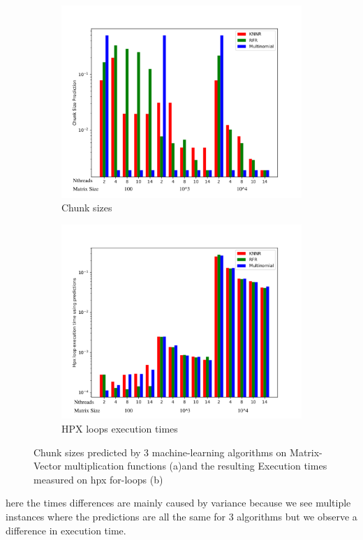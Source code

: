 \begin{figure}[h]
	\centering
	\begin{subfigure}[b]{0.5\textwidth}
		\centering
		\includegraphics[width=\textwidth]{images/bars_Vector_cs.pdf}
		\caption[Network2]%
		{{Chunk sizes}}    
	\end{subfigure}
	\hfill
	\begin{subfigure}[b]{0.49\textwidth}  
		\centering 
		\includegraphics[width=\textwidth]{images/bars_vector_times.pdf}
		\caption[]%
		{{HPX loops execution times}}    
	\end{subfigure}
	\caption{Chunk sizes predicted by 3 machine-learning algorithms on Matrix-Vector multiplication functions (a)and the resulting Execution times measured on hpx for-loops (b)} 
\end{figure}
here the times differences are mainly caused by variance because we see multiple instances where the predictions are all the same for 3 algorithms but we observe a difference in execution time.

